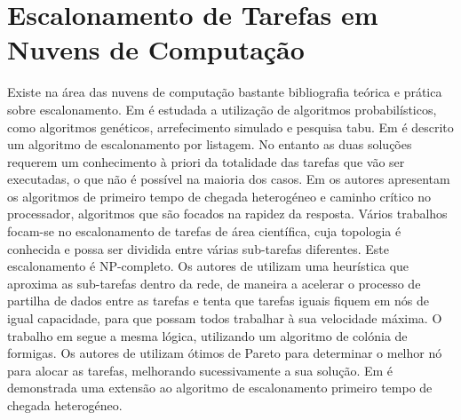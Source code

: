 

\section{Escalonamento de Tarefas em Nuvens de Computação}\label{sec:escalonamento}

Existe na área das nuvens de computação bastante bibliografia teórica e prática sobre escalonamento. Em \cite{abraham2000nature} é estudada a utilização de algoritmos probabilísticos, como algoritmos genéticos, arrefecimento simulado e pesquisa tabu. Em \cite{daoud2008high} é descrito um algoritmo de escalonamento por listagem. No entanto as duas soluções requerem um conhecimento à priori da totalidade das tarefas que vão ser executadas, o que não é possível na maioria dos casos. Em \cite{topcuoglu2002performance} os autores apresentam os algoritmos de primeiro tempo de chegada heterogéneo e caminho crítico no processador, algoritmos que são focados na rapidez da resposta. Vários trabalhos focam-se no escalonamento de tarefas de área científica, cuja topologia é conhecida e possa ser dividida entre várias sub-tarefas diferentes. Este escalonamento é NP-completo. Os autores de \cite{gupta2012optimizing} utilizam uma heurística que aproxima as sub-tarefas dentro da rede, de maneira a acelerar o processo de partilha de dados entre as tarefas e tenta que tarefas iguais fiquem em nós de igual capacidade, para que possam todos trabalhar à sua velocidade máxima. O trabalho em \cite{chen2009ant} segue a mesma lógica, utilizando um algoritmo de colónia de formigas. Os autores de \cite{su2013cost} utilizam ótimos de Pareto para determinar o melhor nó para alocar as tarefas, melhorando sucessivamente a sua solução. Em \cite{zheng2013budget} é demonstrada uma extensão ao algoritmo de escalonamento primeiro tempo de chegada heterogéneo. 


